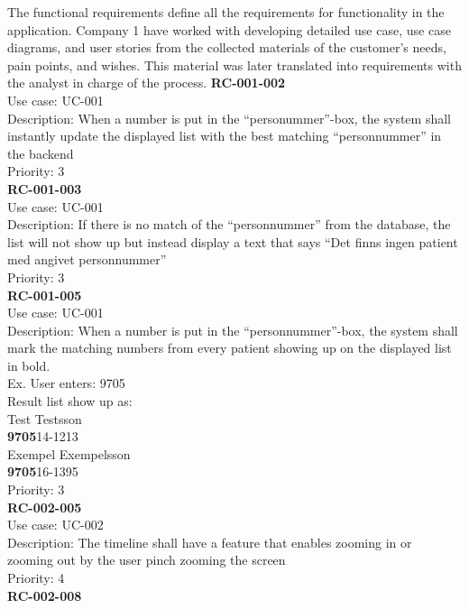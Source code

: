 The functional requirements define all the requirements for functionality in the application. Company 1 have worked with developing detailed use case, use case diagrams, and user stories from the collected materials of the customer's needs, pain points, and wishes. This material was later translated into requirements with the analyst in charge of the process.
\newline
\newline
\textbf{RC-001-002} \\
Use case: UC-001 \\
Description: When a number is put in the “personummer”-box, the system shall instantly update the displayed list with the best matching “personnummer” in the backend \\
Priority: 3\\
\newline
\textbf{RC-001-003}\\
Use case: UC-001\\
Description: If there is no match of the “personnummer” from the database, the list will not show up but instead display a text that says “Det finns ingen patient med angivet personnummer” \\
Priority: 3\\
\newline
\textbf{RC-001-005}\\
Use case: UC-001\\
Description: When a number is put in the “personnummer”-box, the system shall mark the matching numbers from every patient showing up on the displayed list in bold.\\
Ex. User enters: 9705 \\
Result list show up as:\\
Test Testsson\\
\textbf{9705}14-1213 \\
Exempel Exempelsson \\
\textbf{9705}16-1395
\\
Priority: 3\\
\newline
\textbf{RC-002-005} \\
Use case: UC-002 \\
Description: The timeline shall have a feature that enables zooming in or zooming out by the user pinch zooming the screen\\
Priority: 4\\
\newline
\textbf{RC-002-008} \\
